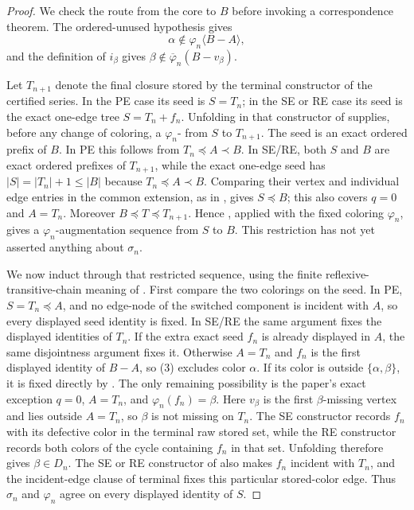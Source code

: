 \begin{proof}
We check the route from the core to $B$ before invoking a correspondence
theorem.  The ordered-unused hypothesis gives
\[
 \alpha\notin\varphi_n\langle B-A\rangle,                     \tag{3}
\]
and the definition of $i_\beta$ gives
$\beta\notin\overline\varphi_n(B-v_\beta)$.

Let $T_{n+1}$ denote the final closure stored by the terminal constructor
of the certified series.  In the PE case its seed is $S=T_n$; in the SE
or RE case its seed is the exact one-edge tree $S=T_n+f_n$.  Unfolding
 in that constructor of
 supplies, before any change of coloring, a
$\varphi_n$- from $S$ to
$T_{n+1}$.  The seed is an exact ordered prefix of $B$.  In PE this
follows from $T_n\preccurlyeq A\prec B$.  In SE/RE, both $S$ and $B$ are
exact ordered prefixes of $T_{n+1}$, while the exact one-edge seed has
$|S|=|T_n|+1\leq |B|$ because $T_n\preccurlyeq A\prec B$.  Comparing
their vertex and individual edge entries in the common extension, as in
, gives $S\preccurlyeq B$; this also
covers $q=0$ and $A=T_n$.  Moreover
$B\preccurlyeq T\preccurlyeq T_{n+1}$.  Hence
, applied with the fixed
coloring $\varphi_n$, gives a $\varphi_n$-augmentation sequence from
$S$ to $B$.  This restriction has not yet asserted anything about
$\sigma_n$.

We now induct through that restricted sequence, using the finite
reflexive-transitive-chain meaning of
.  First compare the two colorings
on the seed.  In PE, $S=T_n\preccurlyeq A$, and no edge-node of the
switched component is incident with $A$, so every displayed seed identity
is fixed.  In SE/RE the same argument fixes the displayed identities of
$T_n$.  If the extra exact seed $f_n$ is already displayed in $A$, the
same disjointness argument fixes it.  Otherwise $A=T_n$ and $f_n$ is the
first displayed identity of $B-A$, so (3) excludes color $\alpha$.  If its
color is outside $\{\alpha,\beta\}$, it is fixed directly by
.  The only remaining possibility is the
paper's exact exception $q=0$, $A=T_n$, and
$\varphi_n(f_n)=\beta$.  Here $v_\beta$ is the first
$\beta$-missing vertex and lies outside $A=T_n$, so $\beta$ is not
missing on $T_n$.  The SE
constructor records $f_n$ with its defective color in the terminal raw
stored set, while the RE constructor records both colors of the cycle
containing $f_n$ in that set.  Unfolding
 therefore gives $\beta\in D_n$.  The SE
or RE constructor of  also makes $f_n$
incident with $T_n$, and the incident-edge clause of terminal
 fixes this particular stored-color edge.  Thus
$\sigma_n$ and $\varphi_n$ agree on every displayed identity of $S$.


\end{proof}
